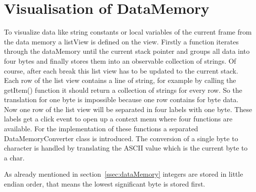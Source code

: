 \section{Visualisation of DataMemory}
\label{sec:implementationOfDataVisualisation}
To visualize data like string constants or local variables of the current frame from the data memory a listView is defined on the view. Firstly a function iterates through the dataMemory until the current stack pointer and groups all data into four bytes and finally stores them into an observable collection of strings. Of course, after each break this list view has to be updated to the current stack. Each row of the list view contains a line of string, for example by calling the getItem() function it should return a collection of strings for every row. So the translation for one byte is impossible because one row contains for byte data. Now one row of the list view will be separated in four labels with one byte. These labels get a click event to open up a context menu where four functions are available. For the implementation of these functions a separated DataMemoryConverter class is introduced. The conversion of a single byte to character is handled by translating the ASCII value which is the current byte to a char.


As already mentioned in section~\ref{ssec:dataMemory} integers are stored in little endian order, that means the lowest significant byte is stored first. 